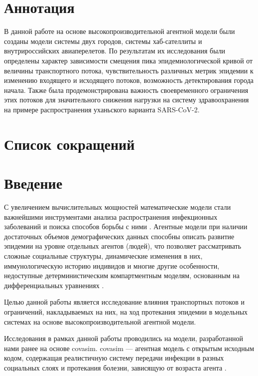 \documentclass[a4paper,12pt]{article} %
\begin{document}
\section*{Аннотация}
В данной работе на основе высокопроизводительной агентной модели были созданы модели системы двух городов, системы хаб-сателлиты и внутрироссийских авиаперелетов. По результатам их исследования были определены характер зависимости смещения пика эпидемиологической кривой от величины транспортного потока, чувствительность различных метрик эпидемии к изменению входящего и исходящего потоков, возможность детектирования города начала. Также была продемонстрирована важность своевременного ограничения этих потоков для значительного снижения нагрузки на систему здравоохранения на примере распространения уханьского варианта SARS-CoV-2.

\newpage

\section*{Список сокращений}
\printglossary[type=\acronymtype, title={}]
\newpage

\tableofcontents
\newpage



\section{Введение}
С увеличением вычислительных мощностей математические модели стали важнейшими инструментами анализа распространения инфекционных заболеваний и поиска способов борьбы с ними \cite{hethcote2000mathematics, hethcote1989three, hethcote1992transmission}. Агентные модели при наличии достаточных объемов демографических данных способны описать развитие эпидемии на уровне отдельных агентов (людей), что позволяет рассматривать сложные социальные структуры, динамические изменения в них, иммунологическую историю индивидов и многие другие особенности, недоступные детерминистическим компартментным моделям, основанным на дифференциальных уравнениях \cite{rakowski2010influenza}.

Целью данной работы является исследование влияния транспортных потоков и ограничений, накладываемых на них, на ход протекания эпидемии в модельных системах на основе высокопроизводительной агентной модели.

Исследования в рамках данной работы проводились на модели, разработанной нами ранее на основе \gls{covasim}. \gls{covasim} — агентная модель с открытым исходным кодом, содержащая реалистичную систему передачи инфекции в разных социальных слоях и протекания болезни, зависящую от возраста агента \cite{kerr2021covasim}.
\end{document}
